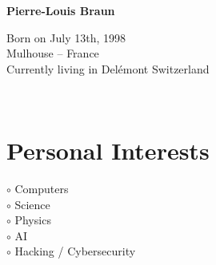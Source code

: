 \documentclass[a4paper,10pt]{article}
\begin{document}
\thispagestyle{empty}

\begin{adjustbox}{valign=t}
\begin{minipage}{0.3\textwidth} %
\begin{center}

\MySkip 	%

\raggedright
{\LARGE \bfseries Pierre-Louis Braun}

\MySkip 	%

\begin{spacing}{1.0}
Born on July 13th, 1998\\
Mulhouse -- France\\
Currently living in Delémont Switzerland\\
\end{spacing}

\MySkip 	%

\textcolor{ColorTwo}{\faEnvelopeO}
 \\
\vspace{-1.5\baselineskip}

\end{center}

\vfill

\section*{Personal Interests}
\raggedright
\begin{spacing}{1.0}
\textcolor{ColorOne}{$\circ$} Computers\\
\textcolor{ColorOne}{$\circ$} Science\\
\textcolor{ColorOne}{$\circ$} Physics\\
\textcolor{ColorOne}{$\circ$} AI\\
\textcolor{ColorOne}{$\circ$} Hacking / Cybersecurity\\
\end{spacing}


\end{minipage}
\end{adjustbox}
\end{document}
